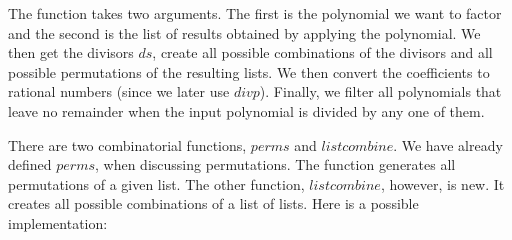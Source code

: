\documentclass[tikz]{scrreprt}
\newcommand{\Varid}[1]{\mathit{#1}}
\begin{document}
The function takes two arguments. The first is
the polynomial we want to factor and the second
is the list of results obtained by applying the polynomial.
We then get the divisors \ensuremath{\Varid{ds}}, create all possible
combinations of the divisors and all possible
permutations of the resulting lists.
We then convert the coefficients to rational numbers
(since we later use \ensuremath{\Varid{divp}}). Finally,
we filter all polynomials that leave no remainder
when the input polynomial is divided by any one of them.

There are two combinatorial functions, \ensuremath{\Varid{perms}} and \ensuremath{\Varid{listcombine}}.
We have already defined \ensuremath{\Varid{perms}}, when discussing
permutations. The function generates all permutations
of a given list. The other function, \ensuremath{\Varid{listcombine}},
however, is new. It creates all possible combinations
of a list of lists. Here is a possible implementation:
\end{document}
